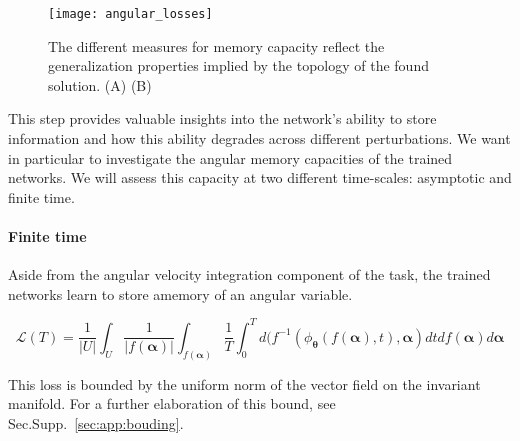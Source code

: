 \documentclass{article} %
\newcounter{ct}
\theoremstyle{definition}
\theoremstyle{remark}
\begin{document}







\begin{figure}[tbhp]
  \centering
  \texttt{[image: angular\_losses]}
  \caption{The different measures for memory capacity reflect the generalization properties implied by the topology of the found solution.
  (A) 
  (B) }
  \label{fig:angular_loss}
\end{figure}



 This step provides valuable insights into the network's ability to store information and how this ability degrades across different perturbations.
 We want in particular to investigate the angular memory capacities of the trained networks.
 We will assess this capacity at two different time-scales:  asymptotic and finite time.
 
\paragraph{Finite time}

Aside from the angular velocity integration component of the task, the trained networks learn to store amemory of an angular variable.



\begin{equation}\label{eq:loss}
    \mathcal{L}(T) = \frac{1}{|U|} \int_U  \frac{1}{|f(\bm{\alpha})|} \int_{f(\bm{\alpha})} \frac{1}{T} \int_0^T d(f^{-1}(\phi_{\bm{\theta}}(f(\bm{\alpha}),t),\bm{\alpha}) dt df(\bm{\alpha}) d\bm{\alpha}
\end{equation}

This loss is bounded by the uniform norm of the vector field on the invariant manifold.
For a further elaboration of this bound, see Sec.Supp.~\ref{sec:app:bouding}.
\end{document}
